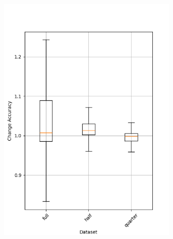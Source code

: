 \begin{figure}
    \begin{subfigure}{0.5\textwidth}
        \centering
        \includegraphics[width=0.95\textwidth]{plots/Dataset_Trained_accuracy.png}
    \end{subfigure}
    \begin{subfigure}{0.5\textwidth}
        \centering

\end{subfigure}
\end{figure}
